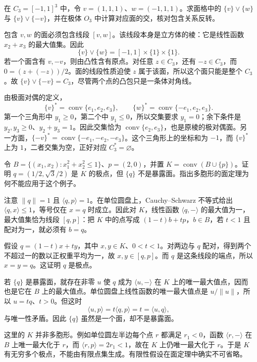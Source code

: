 \begin{exercise}
	\label{g1:exr:cube-face-join}
	在 \(C_3=[-1,1]^3\) 中，令 \(v=(1,1,1)\)、\(w=(-1,1,1)\)。求面格中的 \(\{v\}\vee\{w\}\) 与 \(\{v\}\vee\{-v\}\)，并在极体 \(O_3\) 中计算对应面的交，核对包含关系反转。
\end{exercise}

\begin{solution}
	包含 \(v,w\) 的面必须包含线段 \([v,w]\)。该线段本身是立方体的棱：它是线性函数 \(x_2+x_3\) 的最大值集。因此
	\[
		\{v\}\vee\{w\}=[-1,1]\times\{1\}\times\{1\}.
	\]
	若一个面含有 \(v,-v\)，则由凸性含有原点。对任意 \(z\in C_3\)，还有 \(-z\in C_3\)，而 \(0=(z+(-z))/2\)。面的线段性质迫使 \(z\) 属于该面，所以这个面只能是整个 \(C_3\)。故 \(\{v\}\vee\{-v\}=C_3\)，尽管两个点的凸包只是一条体对角线。

	由极面对偶的定义，
	\[
		\{v\}^*=\operatorname{conv}\{e_1,e_2,e_3\},\qquad \{w\}^*=\operatorname{conv}\{-e_1,e_2,e_3\}.
	\]
	第一个三角形中 \(y_1\ge0\)，第二个中 \(y_1\le0\)，所以交集要求 \(y_1=0\)；余下条件是 \(y_2,y_3\ge0\)、\(y_2+y_3=1\)。因此交集恰为 \(\operatorname{conv}\{e_2,e_3\}\)，也是原棱的极对偶面。另一方面，\(\{-v\}^*=\operatorname{conv}\{-e_1,-e_2,-e_3\}\)。这个三角形上的坐标和为 \(-1\)，而 \(\{v\}^*\) 上为 \(1\)，二者交集为空，正好对应 \(C_3^*=\varnothing\)。
\end{solution}

\begin{exercise}
	\label{g1:exr:nonexposed-point}
	令 \(B=\{(x_1,x_2):x_1^2+x_2^2\le1\}\)、\(p=(2,0)\)，并置 \(K=\operatorname{conv}(B\cup\{p\})\)。证明 \(q=(1/2,\sqrt3/2)\) 是 \(K\) 的极点，但 \(\{q\}\) 不是暴露面。指出多胞形的面定理为何不能应用于这个例子。
\end{exercise}

\begin{solution}
	注意 \(\lVert q\rVert=1\) 且 \(\langle q,p\rangle=1\)。在单位圆盘上，Cauchy--Schwarz 不等式给出 \(\langle q,x\rangle\le1\)，等号仅在 \(x=q\) 时成立。因此对 \(K\)，线性函数 \(\langle q,-\rangle\) 的最大值为一，最大值集恰为线段 \([q,p]\)：把 \(K\) 中的点写成 \((1-t)b+tp\)，\(b\in B\)，若 \(t<1\) 且配对为一，就必须有 \(b=q\)。

	假设 \(q=(1-t)x+ty\)，其中 \(x,y\in K\)、\(0<t<1\)。对两边与 \(q\) 配对，得到两个不超过一的数以正权重平均为一，故 \(x,y\in[q,p]\)。而 \(q\) 是这条线段的端点，所以 \(x=y=q\)。这证明 \(q\) 是极点。

	若 \(\{q\}\) 是暴露面，就存在非零 \(u\) 使 \(q\) 成为 \(\langle u,-\rangle\) 在 \(K\) 上的唯一最大值点，因而也是它在 \(B\) 上的最大值点。单位圆盘上线性函数的唯一最大值点是 \(u/\lVert u\rVert\)，所以 \(u=tq\)、\(t>0\)。但这时
	\[
		\langle u,p\rangle=t\langle q,p\rangle=t=\langle u,q\rangle,
	\]
	与唯一性矛盾。因此 \(\{q\}\) 虽然是一个面，却不是暴露面。

	这里的 \(K\) 并非多胞形。例如单位圆左半边每个点 \(r\) 都满足 \(r_1<0\)，函数 \(\langle r,-\rangle\) 在 \(B\) 上唯一最大化于 \(r\)，而 \(\langle r,p\rangle=2r_1<1\)，故在 \(K\) 上仍唯一最大化于 \(r\)。于是 \(K\) 有无穷多个极点，不能由有限点集生成。有限性假设在面定理中确实不可省略。
\end{solution}

